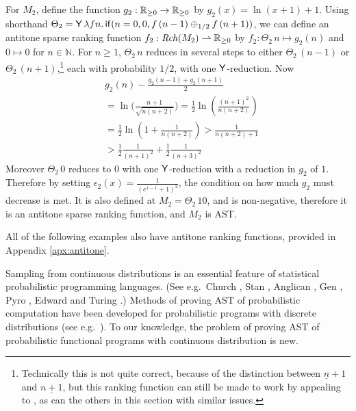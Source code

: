 \begin{example}
\label{ex:unbiased random walk}
For $M_2$, define the function $g_2 : \mathbb{R}_{{\geq}0} \to \mathbb{R}_{{\geq}0}$ by $g_2(x) = \ln(x+1) + 1$.
Using shorthand 
$\Theta_2 = \mathsf{Y} \, \lambda f n . \, 
\mathsf{if}(n = 0, 0, f \, (n - 1) \oplus_{1/2} f \, (n + 1))$, 
we can define an antitone sparse ranking function $f_2 : \mathit{Rch}(M_2) \rightharpoonup \mathbb{R}_{{\geq}0}$ 
by
\(
f_2: {\Theta_2} \, n \mapsto 
g_2(n)
\)
and
$0 \mapsto 0$
for $n \in \mathbb N$.
For $n \geq 1$, $\Theta_2 \, n$ reduces in several steps to either $\Theta_2 \, (n-1)$ or $\Theta_2 \, (n+1)$,\footnote{Technically this is not quite correct, because of the distinction between $\underline n + 1$ and $\underline{n + 1}$, but this ranking function can still be made to work by appealing to , as can the others in this section with similar issues.} each with probability $1/2$, with one $\mathsf{Y}$-reduction.
Now
\begin{align*}%
& g_2(n) - \frac{g_2(n-1) + g_2(n+1)} 2 \\
  &=  \ln \Big(\frac{n+1}{\sqrt{n(n+2)}}\Big) 
  =  \frac 1 2 \ln\left(\frac{(n+1)^2}{n(n+2)}\right) \\
  &=  \frac 1 2 \ln\left(1 + \frac 1 {n(n+2)}\right) 
  >  \frac 1 {n(n+2) + 1} \\
  &>  \frac 1 2 \frac 1 {(n+1)^2} + \frac 1 2 \frac 1 {(n+3)^2}
\end{align*}
Moreover $\Theta_2 \, 0$ reduces to $0$ with one $\mathsf{Y}$-reduction with a reduction in $g_2$ of $1$.
Therefore by setting $\epsilon_2(x) = \frac 1 {(e^{x-1}+1)^2}$, the condition on how much $g_2$ must decrease is met. It is also defined at $M_2 = \Theta_2 \, 10$, and is non-negative, therefore it is an antitone sparse ranking function, and $M_2$ is AST.
\end{example}

All of the following examples also have antitone ranking functions, provided in Appendix \ref{apx:antitone}.


Sampling from continuous distributions is an essential feature of statistical probabilistic programming languages. (See e.g.~Church \cite{DBLP:conf/uai/GoodmanMRBT08}, Stan \cite{carpenter2017stan}, Anglican \cite{DBLP:conf/pkdd/TolpinMW15}, Gen \cite{cusumano-towner2019Gen}, Pyro \cite{bingham2019Pyro}, Edward \cite{tran2016edward} and Turing \cite{ge2018Turing}.)
Methods of proving AST of probabilistic computation have been developed for probabilistic programs with discrete distributions (see e.g.~\cite{DBLP:journals/toplas/LagoG19,DBLP:journals/jacm/KaminskiKMO18,DBLP:conf/lics/OlmedoKKM16,DBLP:conf/lics/KobayashiLG19,DBLP:conf/mfcs/KaminskiK15,DBLP:series/mcs/McIverM05}).
To our knowledge, the problem of proving AST of probabilistic functional programs with continuous distribution is new.

